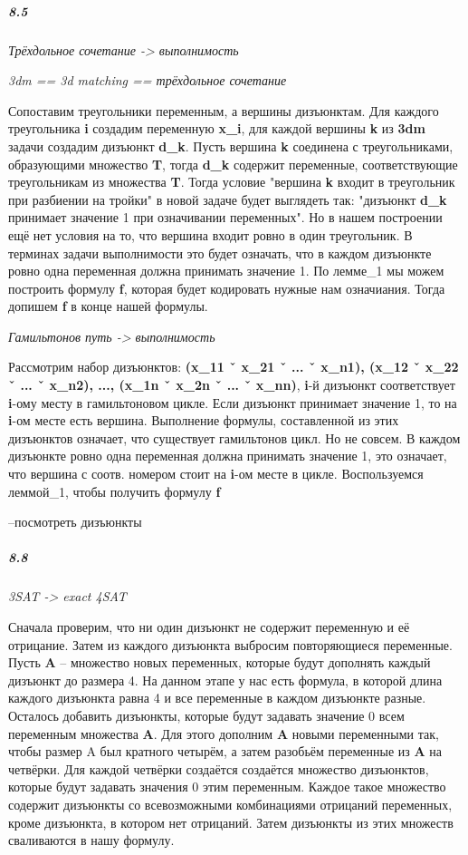 \documentclass{article}
\begin{document}
\subparagraph{8.5}

\textit{Трёхдольное сочетание -> выполнимость}

\textit{3dm == 3d matching == трёхдольное сочетание}

Сопоставим треугольники переменным, а вершины дизъюнктам. Для каждого треугольника \textbf{i} создадим переменную \textbf{x_i}, для каждой вершины \textbf{k} из \textbf{3dm} задачи создадим дизъюнкт \textbf{d_k}. Пусть вершина \textbf{k} соединена с треугольниками, образующими множество \textbf{T}, тогда \textbf{d_k} содержит переменные, соответствующие треугольникам из множества \textbf{T}. Тогда условие "вершина \textbf{k} входит в треугольник при разбиении на тройки" в новой задаче будет выглядеть так: "дизъюнкт \textbf{d_k} принимает значение 1 при означивании переменных". Но в нашем построении ещё нет условия на то, что вершина входит ровно в один треугольник. В терминах задачи выполнимости это будет означать, что в каждом дизъюнкте ровно одна переменная должна принимать значение 1. По лемме_1 мы можем построить формулу \textbf{f}, которая будет кодировать нужные нам означиания. Тогда допишем \textbf{f} в конце нашей формулы.

\textit{Гамильтонов путь -> выполнимость}

Рассмотрим набор дизъюнктов: \textbf{(x_11 ˇ x_21 ˇ ... ˇ x_n1), (x_12 ˇ x_22 ˇ ... ˇ x_n2), ..., (x_1n ˇ x_2n ˇ ... ˇ x_nn)}, \textbf{i}-й дизъюнкт соответствует \textbf{i}-ому месту в гамильтоновом цикле. Если дизъюнкт принимает значение 1, то на \textbf{i}-ом месте есть вершина. Выполнение формулы, составленной из этих дизъюнктов означает, что существует гамильтонов цикл. Но не совсем. В каждом дизъюнкте ровно одна переменная должна принимать значение 1, это означает, что вершина с соотв. номером стоит на \textbf{i}-ом месте в цикле. Воспользуемся леммой_1, чтобы получить формулу \textbf{f}

--посмотреть дизъюнкты

\subparagraph{8.8}

\textit{3SAT -> exact 4SAT}

Сначала проверим, что ни один дизъюнкт не содержит переменную и её отрицание. Затем из каждого дизъюнкта выбросим повторяющиеся переменные. Пусть \textbf{A} -- множество новых переменных, которые будут дополнять каждый дизъюнкт до размера 4. На данном этапе у нас есть формула, в которой длина каждого дизъюнкта равна 4 и все переменные в каждом дизъюнкте разные. Осталось добавить дизъюнкты, которые будут задавать значение 0 всем переменным множества \textbf{A}. Для этого дополним \textbf{A} новыми переменными так, чтобы размер A был кратного четырём, а затем разобьём переменные из \textbf{A} на четвёрки. Для каждой четвёрки создаётся создаётся множество дизъюнктов, которые будут задавать значения 0 этим переменным. Каждое такое множество содержит дизъюнкты со всевозможными комбинациями отрицаний переменных, кроме дизъюнкта, в котором нет отрицаний. Затем дизъюнкты из этих множеств сваливаются в нашу формулу.
\end{document}
